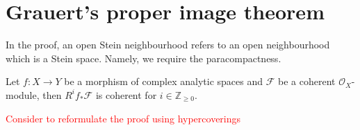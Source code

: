 \section{Grauert's proper image theorem}

In the proof, an open Stein neighbourhood refers to an open neighbourhood which is a Stein space. Namely, we require the paracompactness.

\begin{theorem}[Grauert]\label{thm-properdirectimage}
    Let $f:X\rightarrow Y$ be a morphism of complex analytic spaces and $\mathcal{F}$ be a coherent $\mathcal{O}_X$-module, then $R^if_*\mathcal{F}$ is coherent for $i\in \mathbb{Z}_{\geq 0}$.
\end{theorem}

\textcolor{red}{Consider to reformulate the proof using hypercoverings}
